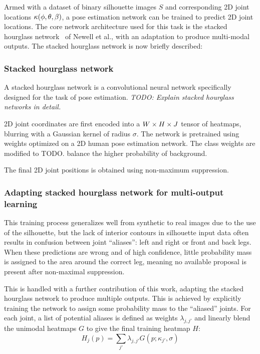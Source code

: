 Armed with a dataset of binary silhouette images $S$ and corresponding 2D joint locations $\kappa(\phi,\theta,\beta)$, a pose estimation network can be trained to predict 2D joint locations. The core network architecture used for this task is the stacked hourglass network~\cite{newell2016stacked} of Newell et al., with an adaptation to produce multi-modal outputs. The stacked hourglass network is now briefly described:

\subsubsection{Stacked hourglass network}

A stacked hourglass network is a convolutional neural network specifically designed for the task of pose estimation. \emph{TODO: Explain stacked hourglass networks in detail.}

2D joint coordinates are first encoded into a $W \times H \times J$ tensor of heatmaps, blurring with a Gaussian kernel of radius $\sigma$. The network is pretrained using weights optimized on a 2D human pose estimation network. The class weights are modified to TODO. balance the higher probability of background. 

The final 2D joint positions is obtained using non-maximum suppression.

\subsubsection{Adapting stacked hourglass network for multi-output learning}

This training process generalizes well from synthetic to real images due to the use of the silhouette, but the lack of interior contours in silhouette input data often results in confusion between joint ``aliases'': left and right or front and back legs.  When these predictions are wrong and of high confidence, little probability mass is assigned to the area around the correct leg, meaning no available proposal is present after non-maximal suppression.

This is handled with a further contribution of this work, adapting the stacked hourglass network to produce multiple outputs. This is achieved by explicitly training the network to assign some probability mass to the ``aliased'' joints. For each joint, a list of potential aliases is defined as weights $\lambda_{j,j'}$ and linearly blend the unimodal heatmaps $G$ to give the final training heatmap $H$:
\begin{equation}
    H_{j}(p) = \sum_{j'} \lambda_{j,j'} G(p; \kappa_{j'}, \sigma)
\end{equation}

